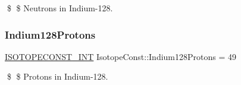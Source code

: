 \$ \$ Neutrons in Indium-\/128. \mbox{\label{group___isotope_const-_indium-_in128_gaaf334c1ac460f71121b3ed0d43c2f27c}} 
\subsubsection{\texorpdfstring{Indium128\+Protons}{Indium128Protons}}
{\footnotesize\ttfamily \mbox{\hyperlink{group___isotope_const-_macros_ga5f18360b3e99483a35c32d789e62621c}{I\+S\+O\+T\+O\+P\+E\+C\+O\+N\+S\+T\+\_\+\+I\+NT}} Isotope\+Const\+::\+Indium128\+Protons = 49}

\$ \$ Protons in Indium-\/128. 